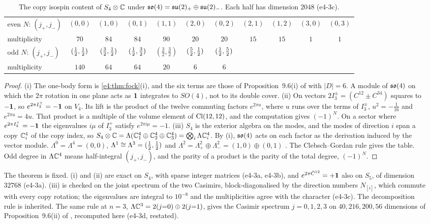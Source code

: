 \begin{table}[htbp]
\centering
\footnotesize
\begin{tabular}{@{}lcccccccccc@{}}
\toprule
even $N$: $(j_+,j_-)$ & $(0,0)$ & $(1,0)$ & $(0,1)$ & $(1,1)$ & $(2,0)$ & $(0,2)$ & $(2,1)$ & $(1,2)$ & $(3,0)$ & $(0,3)$\\
multiplicity & $70$ & $84$ & $84$ & $90$ & $20$ & $20$ & $15$ & $15$ & $1$ & $1$\\
\midrule
odd $N$: $(j_+,j_-)$ & $(\tfrac12,\tfrac12)$ & $(\tfrac32,\tfrac12)$ & $(\tfrac12,\tfrac32)$ & $(\tfrac32,\tfrac32)$ & $(\tfrac52,\tfrac12)$ & $(\tfrac12,\tfrac52)$ & & & &\\
multiplicity & $140$ & $64$ & $64$ & $20$ & $6$ & $6$ & & & &\\
\bottomrule
\end{tabular}
\caption{The copy isospin content of $S_4\otimes\mathbb{C}$ under $\mathfrak{so}(4)=\mathfrak{su}(2)_+\oplus\mathfrak{su}(2)_-$. Each half has dimension $2048$ (e4-3c).}
\label{e4:tab:so4}
\end{table}

\begin{proof}
(i) The one-body form is \cref{e4:thm:fock}(i), and the six terms are those of Proposition~9.6(i) of \cite{RE} with $|D|=6$. A module of $\mathfrak{so}(4)$ on which
the $2\pi$ rotation in one plane acts as $\mathbf 1$ integrates to $SO(4)$, not to its double cover. (ii) On vectors $2I^\pm_3=(C^{12}\pm C^{34})$ squares to
$-\mathbf 1$, so $e^{2\pi I^\pm_3}=-\mathbf 1$ on $V_4$. Its lift is the product of the twelve commuting factors $e^{2\pi u}$, where $u$ runs over the terms of
$I^\pm_3$, $u^2=-\tfrac1{16}$ and $e^{2\pi u}=4u$. That product is a multiple of the volume element of $\mathrm{Cl}(12,12)$, and the computation gives $(-1)^N$. On a
sector where $e^{2\pi I^+_3}=-\mathbf 1$ the eigenvalues $i\mu$ of $I^+_3$ satisfy $e^{2\pi i\mu}=-1$. (iii) $S_4$ is the exterior algebra on the modes, and the
modes of direction $i$ span a copy $\mathbb{C}^4_i$ of the copy index, so $S_4\otimes\mathbb{C}=\Lambda(\mathbb{C}^4_1\oplus\mathbb{C}^4_2\oplus\mathbb{C}^4_3)=\bigotimes_i\Lambda\mathbb{C}^4_i$. By (i), $\mathfrak{so}(4)$ acts
on each factor as the derivation induced by the vector module. $\Lambda^0=\Lambda^4=(0,0)$, $\Lambda^1\cong\Lambda^3=(\tfrac12,\tfrac12)$ and
$\Lambda^2=\Lambda^2_+\oplus\Lambda^2_-=(1,0)\oplus(0,1)$ \cite{Humphreys72}. The Clebsch--Gordan rule gives the table. Odd degree in $\Lambda\mathbb{C}^4$ means half-integral
$(j_+,j_-)$, and the parity of a product is the parity of the total degree, $(-1)^N$.
\end{proof}

The theorem is fixed. (i) and (ii) are exact on $S_4$, with sparse integer matrices (e4-3a, e4-3b), and $e^{2\pi\hat C^{12}}=+\mathbf 1$ also on $S_5$, of dimension
$32768$ (e4-3a). (iii) is checked on the joint spectrum of the two Casimirs, block-diagonalised by the direction numbers $N_{[i]}$, which commute with
every copy rotation; the eigenvalues are integral to $10^{-8}$ and the multiplicities agree with the character (e4-3c). The decomposition rule is
inherited. The same rule at $n=3$, $\Lambda\mathbb{C}^3=2(j{=}0)\oplus2(j{=}1)$, gives the Casimir spectrum $j=0,1,2,3$ on $40,216,200,56$ dimensions of
Proposition~9.6(ii) of \cite{RE}, recomputed here (e4-3d, restated).

